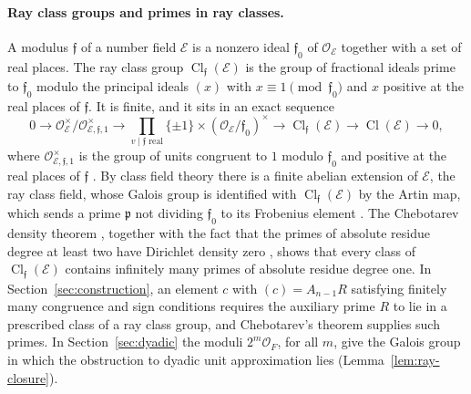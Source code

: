 \documentclass[11pt]{article}
\theoremstyle{plain}
\theoremstyle{definition}
\theoremstyle{remark}
\DeclareMathOperator{\Cl}{Cl}
\newcommand{\OO}{\mathcal O}
\begin{document}
\paragraph{Ray class groups and primes in ray classes.}  A modulus
$\mathfrak f$ of a number field $\mathcal E$ is a nonzero ideal $\mathfrak
f_0$ of $\OO_{\mathcal E}$ together with a set of real places.  The ray
class group $\Cl_{\mathfrak f}(\mathcal E)$ is the group of fractional
ideals prime to $\mathfrak f_0$ modulo the principal ideals $(x)$ with
$x\equiv1\pmod{\mathfrak f_0}$ and $x$ positive at the real places of
$\mathfrak f$.  It is finite, and it sits in an exact sequence
\[
 0\longrightarrow\OO_{\mathcal E}^\times/\OO_{\mathcal E,\mathfrak
 f,1}^\times\longrightarrow
 \prod_{v\mid\mathfrak f\text{ real}}\{\pm1\}\times
   (\OO_{\mathcal E}/\mathfrak f_0)^\times\longrightarrow\Cl_{\mathfrak
   f}(\mathcal E)
 \longrightarrow\Cl(\mathcal E)\longrightarrow0,
\]
where $\OO_{\mathcal E,\mathfrak f,1}^\times$ is the group of units
congruent to $1$ modulo $\mathfrak f_0$ and positive at the real places of
$\mathfrak f$ \cite[Chapter~V, Theorem~1.7]{MilneCFT}.  By class field
theory there is a finite abelian extension of $\mathcal E$, the ray class
field, whose Galois group is identified with $\Cl_{\mathfrak f}(\mathcal
E)$ by the Artin map, which sends a
prime $\mathfrak p$ not dividing $\mathfrak f_0$ to its Frobenius element
\cite[Chapter~V, Theorems~3.5 and~3.6, Corollary~3.7 and
Example~3.9]{MilneCFT}.  The Chebotarev density theorem
\cite[Chapter~VIII, Theorem~7.4]{MilneCFT}, together with the fact that the
primes of absolute residue degree at least two have Dirichlet density zero
\cite[Chapter~VI, Proposition~4.5 and Corollary~4.6]{MilneCFT}, shows that every class of
$\Cl_{\mathfrak f}(\mathcal E)$ contains infinitely many primes of absolute residue
degree one.  In Section~\ref{sec:construction}, an element $c$ with
$(c)=A_{n-1}R$ satisfying finitely many congruence and sign conditions
requires the auxiliary prime $R$ to lie in a prescribed class of a ray class
group, and Chebotarev's theorem supplies such primes.  In
Section~\ref{sec:dyadic} the moduli $2^m\OO_F$, for all $m$, give the
Galois group in which the obstruction to dyadic unit approximation lies
(Lemma~\ref{lem:ray-closure}).
\end{document}
